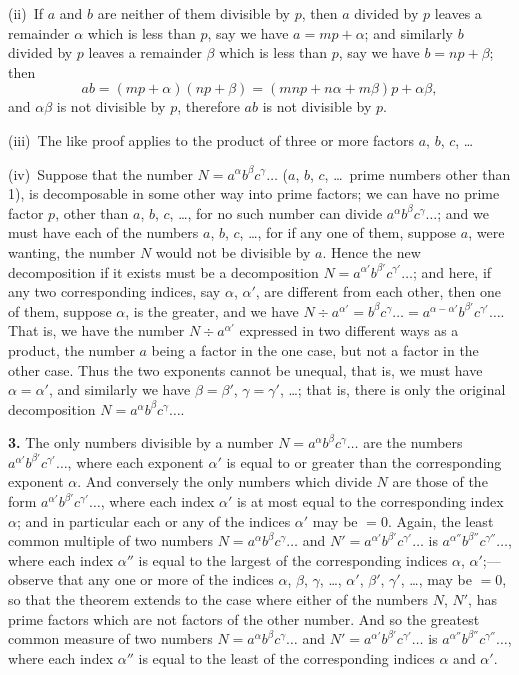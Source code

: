 \documentclass[11pt,a4paper]{book}
\begin{document}
(ii)~If $a$ and $b$ are neither of them divisible by $p$, then $a$ divided by $p$ leaves a remainder $\alpha$ which is less than $p$, say we have $a = mp + \alpha$; and similarly $b$ divided by $p$ leaves a remainder $\beta$ which is less than $p$, say we have $b = np + \beta$; then
\[
ab = (mp + \alpha)(np + \beta) = (mnp + n\alpha + m\beta)p + \alpha\beta,
\]
and $\alpha\beta$ is not divisible by $p$, therefore $ab$ is not divisible by $p$.

(iii)~The like proof applies to the product of three or more factors $a$, $b$, $c$, \ldots

(iv)~Suppose that the number $N = a^{\alpha} b^{\beta} c^{\gamma} \ldots$ ($a$, $b$, $c$, \ldots\ prime numbers other than 1), is decomposable in some other way into prime factors; we can have no prime factor $p$, other than $a$, $b$, $c$, \ldots, for no such number can divide $a^{\alpha} b^{\beta} c^{\gamma} \ldots$; and we must have each of the numbers $a$, $b$, $c$, \ldots, for if any one of them, suppose $a$, were wanting, the number $N$ would not be divisible by $a$. Hence the new decomposition if it exists must be a decomposition $N = a^{\alpha'} b^{\beta'} c^{\gamma'} \ldots$; and here, if any two corresponding indices, say $\alpha$, $\alpha'$, are different from each other, then one of them, suppose $\alpha$, is the greater, and we have $N \div a^{\alpha'} = b^{\beta} c^{\gamma} \ldots = a^{\alpha - \alpha'} b^{\beta'} c^{\gamma'} \ldots$. That is, we have the number $N \div a^{\alpha'}$ expressed in two different ways as a product, the number $a$ being a factor in the one case, but not a factor in the other case. Thus the two exponents cannot be unequal, that is, we must have $\alpha = \alpha'$, and similarly we have $\beta = \beta'$, $\gamma = \gamma'$, \ldots; that is, there is only the original decomposition $N = a^{\alpha} b^{\beta} c^{\gamma} \ldots$.


\textbf{3.}\quad
The only numbers divisible by a number $N = a^{\alpha} b^{\beta} c^{\gamma} \ldots$ are the numbers $a^{\alpha'} b^{\beta'} c^{\gamma'} \ldots$, where each exponent $\alpha'$ is equal to or greater than the corresponding exponent $\alpha$. And conversely the only numbers which divide $N$ are those of the form $a^{\alpha'} b^{\beta'} c^{\gamma'} \ldots$, where each index $\alpha'$ is at most equal to the corresponding index $\alpha$; and in particular each or any of the indices $\alpha'$ may be $= 0$. Again, the least common multiple of two numbers $N = a^{\alpha} b^{\beta} c^{\gamma} \ldots$ and $N' = a^{\alpha'} b^{\beta'} c^{\gamma'} \ldots$ is $a^{\alpha''} b^{\beta''} c^{\gamma''} \ldots$, where each index $\alpha''$ is equal to the largest of the corresponding indices $\alpha$, $\alpha'$;---observe that any one or more of the indices $\alpha$, $\beta$, $\gamma$, \ldots, $\alpha'$, $\beta'$, $\gamma'$, \ldots, may be $= 0$, so that the theorem extends to the case where either of the numbers $N$, $N'$, has prime factors which are not factors of the other number. And so the greatest common measure of two numbers $N = a^{\alpha} b^{\beta} c^{\gamma} \ldots$ and $N' = a^{\alpha'} b^{\beta'} c^{\gamma'} \ldots$ is $a^{\alpha''} b^{\beta''} c^{\gamma''} \ldots$, where each index $\alpha''$ is equal to the least of the corresponding indices $\alpha$ and $\alpha'$.
\end{document}
